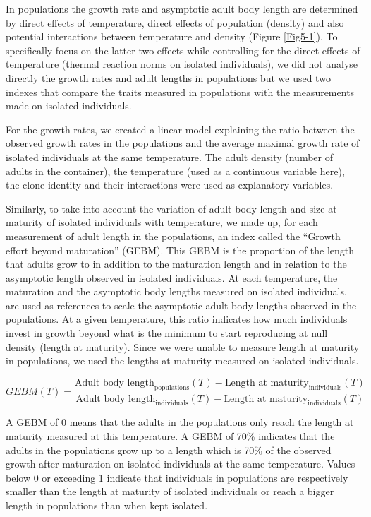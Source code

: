 In populations the growth rate and asymptotic adult body length are determined
by direct effects of temperature, direct effects of population (density) and
also potential interactions between temperature and density (Figure \ref{Fig5-1}). To
specifically focus on the latter two effects while controlling for the direct
effects of temperature (thermal reaction norms on isolated individuals), we did
not analyse directly the growth rates and adult lengths in populations but we
used two indexes that compare the traits measured in populations with the
measurements made on isolated individuals.

For the growth rates, we created a linear model explaining the ratio between the
observed growth rates in the populations and the average maximal growth rate of
isolated individuals at the same temperature. The adult density (number of
adults in the container), the temperature (used as a continuous variable here),
the clone identity and their interactions were used as explanatory variables.

Similarly, to take into account the variation of adult body length and size at
maturity of isolated individuals with temperature, we made up, for each
measurement of adult length in the populations, an index called the ``Growth
effort beyond maturation'' (GEBM). This GEBM is the proportion of the length that
adults grow to in addition to the maturation length and in relation to the
asymptotic length observed in isolated individuals. At each temperature, the
maturation and the asymptotic body lengths measured on isolated individuals, are
used as references to scale the asymptotic adult body lengths observed in the
populations. At a given temperature, this ratio indicates how much individuals
invest in growth beyond what is the minimum to start reproducing at null density
(length at maturity). Since we were unable to measure length at maturity in
populations, we used the lengths at maturity measured on isolated individuals.

\begin{equation}
GEBM(T)=\frac{\text{Adult body length}_{\text{populations}}(T) -
\text{Length at maturity}_{\text{individuals}}(T)}{\text{Adult body
length}_{\text{individuals}}(T) -
\text{Length at maturity}_{\text{individuals}}(T)}
\end{equation}
 
A GEBM of 0 means that the adults in the populations only reach the length at
maturity measured at this temperature. A GEBM of 70\% indicates that the adults
in the populations grow up to a length which is 70\% of the observed growth
after maturation on isolated individuals at the same temperature. Values below 0
or exceeding 1 indicate that individuals in populations are respectively smaller
than the length at maturity of isolated individuals or reach a bigger length in
populations than when kept isolated.


